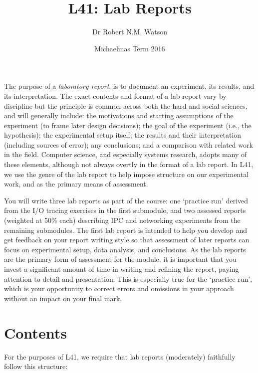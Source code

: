 \documentclass[a4paper,10pt]{article}
\begin{document}
\title{L41: Lab Reports}
\author{Dr Robert N.M. Watson}
\date{Michaelmas Term 2016}
\maketitle

The purpose of a \textit{laboratory report}, is to document an experiment, its
results, and its interpretation.
The exact contents and format of a lab report vary by discipline but the
principle is common across both the hard and social sciences, and will
generally include: the motivations and starting assumptions of the experiment
(to frame later design decisions); the goal of the experiment (i.e., the
hypothesis); the experimental setup itself; the results and their
interpretation (including sources of error); any conclusions; and a
comparison with related work in the field.
Computer science, and especially systems research, adopts many of these
elements, although not always overtly in the format of a lab report.
In L41, we use the genre of the lab report to help impose structure on our
experimental work, and as the primary means of assessment.

You will write three lab reports as part of the course: one `practice run'
derived from the I/O tracing exercises in the first submodule, and two
assessed reports (weighted at 50\% each) describing IPC and networking
experiments from the remaining submodules.
The first lab report is intended to help you develop and get feedback on your
report writing style so that assessment of later reports can focus on
experimental setup, data analysis, and conclusions.
As the lab reports are the primary form of assessment for the module, it is
important that you invest a significant amount of time in writing and refining
the report, paying attention to detail and presentation.
This is especially true for the `practice run', which is your opportunity to
correct errors and omissions in your approach without an impact on your final
mark.

\section*{Contents}

For the purposes of L41, we require that lab reports (moderately) faithfully
follow this structure:
\end{document}
